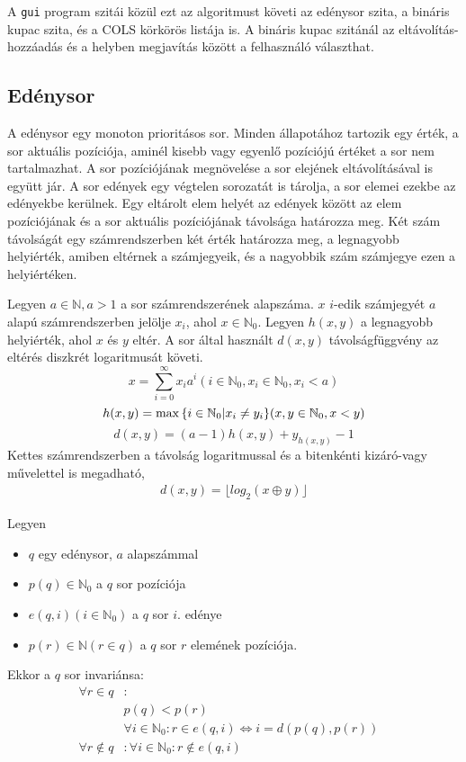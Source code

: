 A \texttt{gui} program szitái közül ezt az algoritmust követi az edénysor szita, a bináris kupac szita, és a COLS körkörös listája is. A bináris kupac szitánál az eltávolítás-hozzáadás és a helyben megjavítás között a felhasználó választhat.

\subsection{Edénysor}

A edénysor egy monoton prioritásos sor.
Minden állapotához tartozik egy érték, a sor aktuális pozíciója, aminél kisebb vagy egyenlő pozíciójú értéket a sor nem tartalmazhat.
A sor pozíciójának megnövelése a sor elejének eltávolításával is együtt jár.
A sor edények egy végtelen sorozatát is tárolja, a sor elemei ezekbe az edényekbe kerülnek.
Egy eltárolt elem helyét az edények között az elem pozíciójának és a sor aktuális pozíciójának távolsága határozza meg.
Két szám távolságát egy számrendszerben két érték határozza meg, a legnagyobb helyiérték, amiben eltérnek a számjegyeik, és  a nagyobbik szám számjegye ezen a helyiértéken.

Legyen $a \in \mathbb{N}, a > 1$ a sor számrendszerének alapszáma.
$x$ $i$-edik számjegyét $a$ alapú számrendszerben jelölje $x_i$, ahol $x \in \mathbb{N}_0$.
Legyen $h(x, y)$ a legnagyobb helyiérték, ahol $x$ és $y$ eltér.
A sor által használt $d(x, y)$ távolságfüggvény az eltérés diszkrét logaritmusát követi.
\begin{equation}
x = \sum_{i=0}^{\infty} x_i a^i (i \in \mathbb{N}_0, x_i \in \mathbb{N}_0, x_i < a)
\end{equation}
\begin{equation}
h(x, y) = \max{\{i \in \mathbb{N}_0 | x_i \not= y_i\}} (x, y \in \mathbb{N}_0, x<y)\\
\end{equation}
\begin{equation}
\label{ddef}
d(x, y) = (a-1) h(x, y) + y_{h(x, y)} - 1
\end{equation}
Kettes számrendszerben a távolság logaritmussal és a bitenkénti kizáró-vagy művelettel is megadható,
\begin{align*}
d(x, y) = \lfloor log_2{(x \oplus y)} \rfloor
\end{align*}

Legyen
\begin{itemize}
\item $q$ egy edénysor, $a$ alapszámmal
\item $p(q) \in \mathbb{N}_0$ a $q$ sor pozíciója
\item $e(q, i) (i \in \mathbb{N}_0)$ a $q$ sor $i$. edénye
\item $p(r) \in \mathbb{N} (r \in q)$ a $q$ sor $r$ elemének pozíciója.
\end{itemize}
Ekkor a $q$ sor invariánsa:
\begin{align*}
\forall r \in q &: &\\ 
	& p(q) < p(r) \\
	& \forall i \in \mathbb{N}_0: r \in e(q, i) \iff i=d(p(q), p(r)) \\
\forall r \not\in q &: \forall i \in \mathbb{N}_0: r \not\in e(q, i)
\end{align*}

